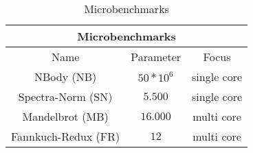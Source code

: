 \begin{table}[H]
    \centering
    \begin{tabular}{|| c | c | c ||}
    \hline
    \multicolumn{3}{||c||}{Microbenchmarks} \\ [0.5ex] \hline\hline
    Name & Parameter & Focus \\\hline
    NBody (NB) & $50*10^6$ & single core \\
    Spectra-Norm (SN) & $5.500$ & single core \\
    Mandelbrot (MB) & $16.000$ & multi core \\
    Fannkuch-Redux (FR) & $12$ & multi core \\\hline
    \end{tabular}
    \caption{Microbenchmarks}
    \label{tab:microbenchmarks}
\end{table}